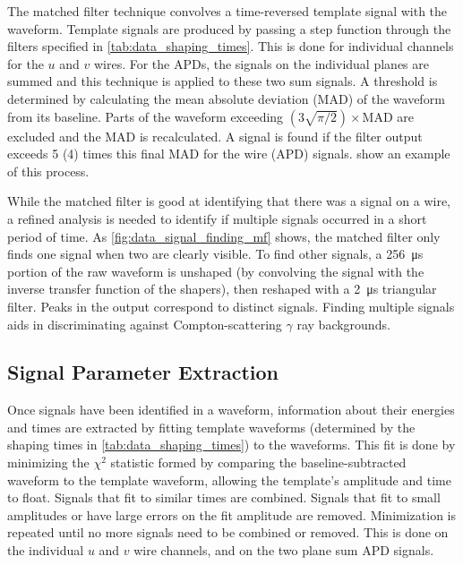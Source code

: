\documentclass[herrin-thesis.tex]{subfiles}
\begin{document}
The matched filter technique \cite{North:1963fk} convolves a time-reversed template signal with the waveform. Template signals are produced by passing a step function through the filters specified in \cref{tab:data_shaping_times}. This is done for individual channels for the \(u\) and \(v\) wires. For the APDs, the signals on the individual planes are summed and this technique is applied to these two sum signals. A threshold is determined by calculating the mean absolute deviation (MAD) of the waveform from its baseline. Parts of the waveform exceeding \((3\sqrt{\pi/2})\times\text{MAD}\) are excluded and the MAD is recalculated. A signal is found if the filter output exceeds 5 (4) times this final MAD for the wire (APD) signals.  show an example of this process.

While the matched filter is good at identifying that there was a signal on a wire, a refined analysis is needed to identify if multiple signals occurred in a short period of time. As \cref{fig:data_signal_finding_mf} shows, the matched filter only finds one signal when two are clearly visible. To find other signals, a \SI{256}{\micro\s} portion of the raw waveform is unshaped (by convolving the signal with the inverse transfer function of the shapers), then reshaped with a \SI{2}{\micro\s} triangular filter. Peaks in the output correspond to distinct signals. Finding multiple signals aids in discriminating against Compton-scattering \(\gamma\) ray backgrounds.

\subsection{Signal Parameter Extraction}
\label{sec:data_signal_extraction}
Once signals have been identified in a waveform, information about their energies and times are extracted by fitting template waveforms (determined by the shaping times in \cref{tab:data_shaping_times}) to the waveforms. This fit is done by minimizing the \(\chi^2\) statistic formed by comparing the baseline-subtracted waveform to the template waveform, allowing the template's amplitude and time to float. Signals that fit to similar times are combined. Signals that fit to small amplitudes or have large errors on the fit amplitude are removed. Minimization is repeated until no more signals need to be combined or removed. This is done on the individual \(u\) and \(v\) wire channels, and on the two plane sum APD signals.
\end{document}

